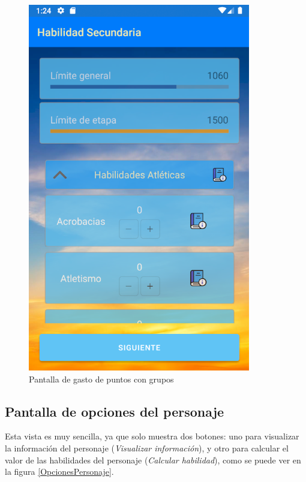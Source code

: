 \begin{figure}[H]
    \centering
    \includegraphics[scale=0.7]{Figures/Capturas/GastoPuntosGrupo.png}
    \caption{Pantalla de gasto de puntos con grupos}
    \label{GastoPuntosGrupos}    
\end{figure}

\subsection{Pantalla de opciones del personaje}
Esta vista es muy sencilla, ya que solo muestra dos botones: uno para visualizar la información del personaje 
(\textit{Visualizar información}), y otro para calcular el valor de las habilidades del personaje (\textit{Calcular habilidad}), 
como se puede ver en la figura \ref*{OpcionesPersonaje}.

